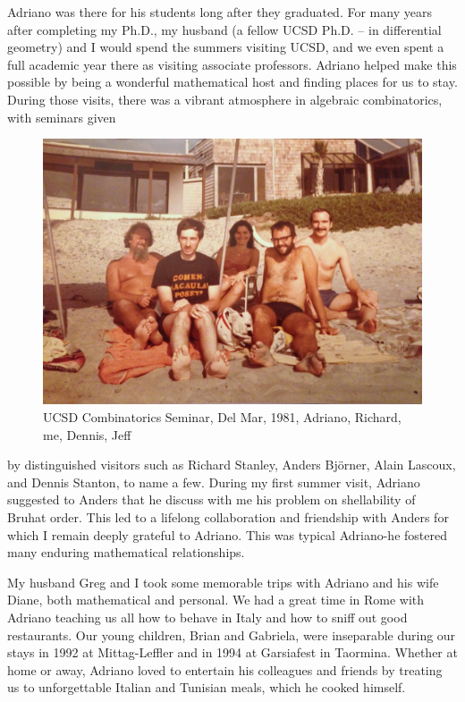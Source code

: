 \documentclass{notices}
\begin{document}
Adriano was there for his students long after they graduated.    For many years after completing my Ph.D., my husband (a fellow UCSD Ph.D. -- in differential geometry)  and I would spend the summers visiting UCSD, and we even spent a full academic year there as visiting associate professors.   
Adriano helped make this possible by being a wonderful mathematical host and finding  places for us to stay.   
During those visits, there was a vibrant atmosphere in algebraic combinatorics, with seminars given
\begin{figure}
 \centering
    \includegraphics[width=0.95\linewidth]{Michelle_Wachs/IMG_2458.jpg} 
  {\footnotesize UCSD Combinatorics Seminar, Del Mar, 1981, Adriano, Richard, me, Dennis, Jeff}
\end{figure}
by distinguished visitors such as Richard Stanley, Anders Bj\"orner, Alain Lascoux, and Dennis Stanton, to name a few. 
 During my first summer visit, Adriano suggested to Anders that he discuss with me his problem  on shellability of Bruhat order.   This led to a lifelong collaboration and friendship with Anders for which I remain deeply grateful to Adriano. This was typical Adriano-he fostered many enduring mathematical relationships.

My husband Greg and I took some memorable trips with Adriano and his wife Diane, both mathematical and personal.  We had a great time in Rome with Adriano teaching us all how to behave in Italy and how to sniff out good restaurants. Our young children, Brian and Gabriela, were inseparable during our stays in 1992 at Mittag-Leffler and in 1994 at Garsiafest in Taormina. Whether at home or away,  Adriano loved to entertain his colleagues and friends by treating us to unforgettable Italian and Tunisian meals, which he cooked himself.
\end{document}
